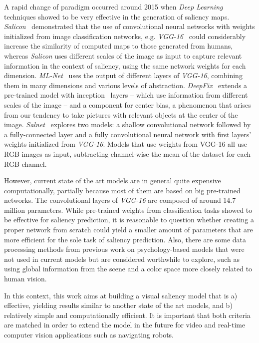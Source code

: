 \documentclass[10pt,twocolumn,letterpaper]{article}
\begin{document}
A rapid change of paradigm occurred around 2015 when \emph{Deep Learning}
techniques showed to be very effective in the generation of saliency
maps.
\emph{Salicon}~\cite{jiang_2015} demonstrated that the use of
convolutional neural networks with weights initialized from
image classification networks, e.g. \emph{VGG-16}~\cite{zisserman_2014}
could considerably increase the similarity of computed maps to those
generated from humans, whereas \emph{Salicon} uses different scales of the image as input to capture relevant
information in the context of saliency, using the same network weights
for each dimension.
\emph{ML-Net}~\cite{cornia_2016} uses the output of different layers
of \emph{VGG-16}, combining them in many dimensions and various levels of
abstraction.
\emph{DeepFix}~\cite{kruthiventi_2015} extends a pre-trained model with
inception~\cite{szegedy_2014} layers -- which use information from different
scales of the image -- and a component for center bias, a phenomenon that arises from our tendency to take pictures with relevant
objects at the center of the image.
\emph{Salnet}~\cite{pan_2016} explores two models: a shallow convolutional network followed by a fully-connected layer and a fully convolutional
neural network with first layers' weights initialized from \emph{VGG-16}.
Models that use weights from VGG-16 all use RGB images as input, subtracting
channel-wise the mean of the dataset for each RGB channel.

However, current state of the art models are in general quite expensive computationally,
partially because most of them are based on big pre-trained networks.
The convolutional layers of \emph{VGG-16} are composed of around 14.7
million parameters.
While pre-trained weights from classification tasks showed to be effective
for saliency prediction, it is reasonable to question whether
creating a proper network from scratch could yield a smaller amount of
parameters that are more efficient for the sole task of saliency prediction.
Also, there are some data processing methods from previous work on
psychology-based models that were not used in current models but
are considered worthwhile to explore,
such as using global information from the scene and a color space more
closely related to human vision.

In this context, this work aims at building a visual saliency model that is a) effective,
yielding results similar to another state of the art models,
and b) relatively simple and computationally efficient.
It is important that both criteria are matched in order to extend the
model in the future for video and real-time computer vision applications
such as navigating robots.
\end{document}
